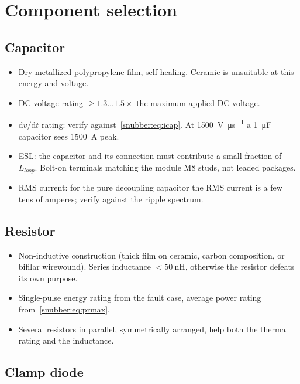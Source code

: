 \section{Component selection}

\subsection{Capacitor}

\begin{itemize}[nosep]
\item Dry metallized polypropylene film, self-healing. Ceramic is unsuitable
      at this energy and voltage.
\item DC voltage rating $\ge 1.3\ldots1.5\times$ the maximum applied DC
      voltage.
\item $\mathrm{d}v/\mathrm{d}t$ rating: verify against~\eqref{snubber:eq:icap}. At
      \SI{1500}{\volt\per\micro\second} a \SI{1}{\micro\farad} capacitor sees
      \SI{1500}{\ampere} peak.
\item ESL: the capacitor and its connection must contribute a small fraction
      of $L_{loop}$. Bolt-on terminals matching the module M8 studs, not
      leaded packages.
\item RMS current: for the pure decoupling capacitor the RMS current is a few
      tens of amperes; verify against the ripple spectrum.
\end{itemize}

\subsection{Resistor}

\begin{itemize}[nosep]
\item Non-inductive construction (thick film on ceramic, carbon composition,
      or bifilar wirewound). Series inductance $<\SI{50}{\nano\henry}$,
      otherwise the resistor defeats its own purpose.
\item Single-pulse energy rating from the fault case, average power rating
      from~\eqref{snubber:eq:prmax}.
\item Several resistors in parallel, symmetrically arranged, help both the
      thermal rating and the inductance.
\end{itemize}

\subsection{Clamp diode}

